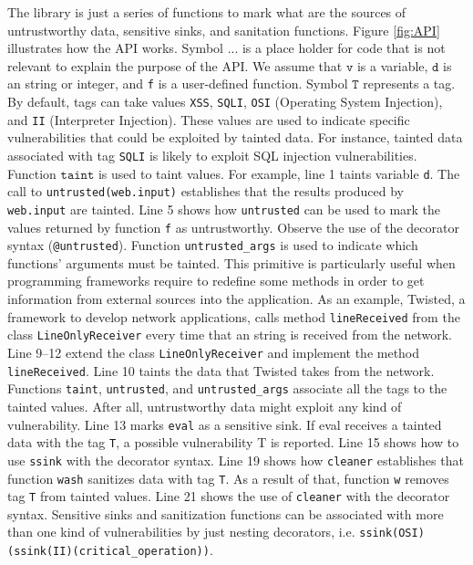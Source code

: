 \documentclass[oribibl]{llncs}
\begin{document}
The library is just a series of functions 
to mark  
what are the sources of untrustworthy data, sensitive sinks, and
sanitation functions. 
Figure \ref{fig:API} illustrates how the API works.
Symbol $\texttt{...}$ is a place holder for code that 
is not relevant to explain the purpose of the API.
We assume that $\texttt{v}$ is a variable, $\texttt{d}$ is an
string or integer, and \texttt{f} is a user-defined function. Symbol
$\texttt{T}$ represents a tag. 
By default, tags can take values  
\texttt{XSS}, \texttt{SQLI}, \texttt{OSI} (Operating System Injection), and
\texttt{II} (Interpreter Injection).
These values are used to indicate specific vulnerabilities that 
could be exploited by tainted data.
For instance, 
tainted data associated with tag \texttt{SQLI} is likely to exploit 
SQL injection vulnerabilities.
Function $\texttt{taint}$ is used to taint values. 
For example, line 1 taints variable \texttt{d}.
The call to \texttt{untrusted(web.input)} 
establishes that the results produced by \texttt{web.input} are tainted.
Line 5 shows how \texttt{untrusted} can be used  to mark 
the values returned by function \texttt{f}
as untrustworthy. Observe the use of the decorator syntax
 (\texttt{@untrusted}).
Function  
\texttt{untrusted\_args} is used to indicate which functions' arguments must be
tainted. This primitive is particularly useful 
when programming frameworks require 
to redefine some methods in order to get information from  
external sources into the application.
As an example, Twisted\cite{Twisted}, a framework to 
develop network applications, 
calls method \texttt{lineReceived} from the class
\texttt{LineOnlyReceiver} 
every time that an string is received from the network.
Line 9--12 extend the class \texttt{LineOnlyReceiver}
and implement the method \texttt{lineReceived}. 
Line 10 taints the data that Twisted takes 
from the network. 
Functions \texttt{taint}, \texttt{untrusted}, and
\texttt{untrusted\_args} associate all the tags to the
tainted values. After all, 
untrustworthy data might exploit any kind of vulnerability. 
Line 13 marks \texttt{eval} as a sensitive sink. If eval receives 
a tainted data with the tag \texttt{T},
a possible vulnerability T is reported. Line 15 shows how to 
use \texttt{ssink} with the decorator syntax. 
Line 19 shows how \texttt{cleaner} establishes that 
function \texttt{wash} sanitizes data with tag \texttt{T}. 
As a result of that, function \texttt{w} removes tag \texttt{T}
from tainted values. Line 21 shows the use
of \texttt{cleaner} with the decorator syntax.
{Sensitive sinks and sanitization functions
can be associated with more than one kind of vulnerabilities 
by just nesting decorators,
i.e. \texttt{ssink(OSI)(ssink(II)(critical\_operation))}}.
\end{document}
